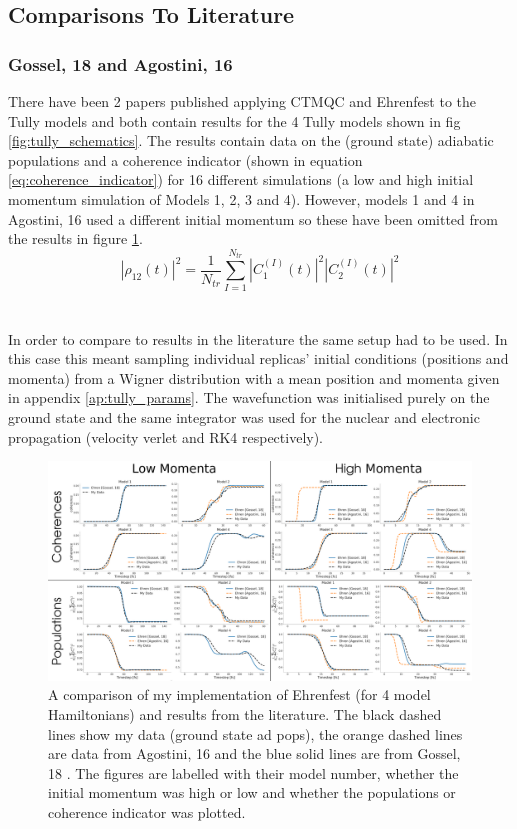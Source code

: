 \subsection{Comparisons To Literature}
\subsubsection{Gossel, 18 and Agostini, 16}
\label{sect:EhrenCompare}
There have been 2 papers published applying CTMQC and Ehrenfest to the Tully models \cite{gossel_coupled-trajectory_2018, agostini_quantum-classical_2016} and both contain results for the 4 Tully models shown in fig \ref{fig:tully_schematics}. The results contain data on the (ground state) adiabatic populations and a coherence indicator (shown in equation \eqref{eq:coherence_indicator}) for 16 different simulations (a low and high initial momentum simulation of Models 1, 2, 3 and 4). However, models 1 and 4 in Agostini, 16 \cite{agostini_quantum-classical_2016} used a different initial momentum so these have been omitted from the results in figure \ref{fig:LitCompEhrenTully}.
\begin{equation}
	|\rho_{12}(t)|^2 = \frac{1}{N_{tr}} \sum_{I=1}^{N_{tr}} |C_{1}^{(I)}(t)|^2 |C_{2}^{(I)}(t)|^2
	\label{eq:coherence_indicator}
\end{equation}
\\\\
In order to compare to results in the literature the same setup had to be used. In this case this meant sampling individual replicas' initial conditions (positions and momenta) from a Wigner distribution with a mean position and momenta given in appendix \ref{ap:tully_params}. The wavefunction was initialised purely on the ground state and the same integrator was used for the nuclear and electronic propagation (velocity verlet and RK4 respectively).
\begin{figure}[ht]
	\includegraphics[width=\textwidth]{img/CTMQC/TullyModels/Ehren_LitComp.png}
	\caption{\label{fig:LitCompEhrenTully}A comparison of my implementation of Ehrenfest (for 4 model Hamiltonians) and results from the literature. The black dashed lines show my data (ground state ad pops), the orange dashed lines are data from Agostini, 16 \cite{agostini_quantum-classical_2016} and the blue solid lines are from Gossel, 18 \cite{gossel_coupled-trajectory_2018}. The figures are labelled with their model number, whether the initial momentum was high or low and whether the populations or coherence indicator was plotted.}
\end{figure}
